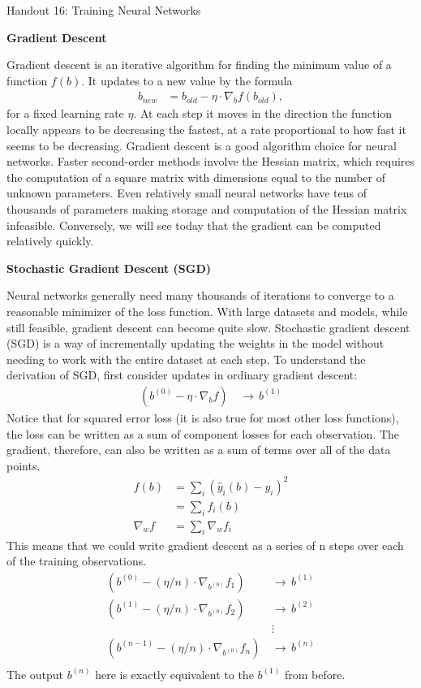 \documentclass[12pt,hidelinks]{article}
\numberwithin{equation}{section}
\begin{document}
{\LARGE Handout 16: Training Neural Networks}

\vspace*{18pt}

\textbf{Gradient Descent}

Gradient descent is an iterative
algorithm for finding the minimum value of a function $f(b)$. It updates
to a new value by the formula
\begin{align}
b_{new} &= b_{old} - \eta \cdot \nabla_{b} f (b_{old}),
\end{align}
for a fixed learning rate $\eta$. At each step it moves in the direction
the function locally appears to be decreasing the fastest, at a rate
proportional to how fast it seems to be decreasing. Gradient descent is
a good algorithm choice for neural networks. Faster second-order methods
involve the Hessian matrix, which requires the computation
of a square matrix with dimensions equal to the number of unknown parameters.
Even relatively small neural networks have tens of thousands of parameters
making storage and computation of the Hessian matrix infeasible. Conversely,
we will see today that the gradient can be computed
relatively quickly.

\textbf{Stochastic Gradient Descent (SGD)}

Neural networks generally need many thousands of iterations to converge to
a reasonable minimizer of the loss function. With large datasets
and models, while still feasible, gradient descent can become quite slow.
Stochastic gradient descent (SGD) is a way of incrementally updating
the weights in the model without needing to work with the entire
dataset at each step. To understand the derivation of SGD, first
consider updates in ordinary gradient descent:
\begin{align}
\left( b^{(0)} - \eta \cdot \nabla_b f \right) \, &\rightarrow \, b^{(1)}
\end{align}
Notice that for squared error loss (it is also true for most other
loss functions), the loss can be written as a sum of component losses
for each observation. The gradient, therefore, can also be written
as a sum of terms over all of the data points.
\begin{align}
f(b) &= \sum_i (\widehat{y}_i(b) - y_i)^2 \\
&= \sum_i f_i(b) \\
\nabla_w f &= \sum_i \nabla_w f_i
\end{align}
This means that we could write gradient descent as a series of
n steps over each of the training observations.
\begin{align}
\left( b^{(0)} - (\eta / n) \cdot \nabla_{b^{(0)}} f_1 \right) \, &\rightarrow \, b^{(1)} \\
\left( b^{(1)} - (\eta / n) \cdot \nabla_{b^{(0)}} f_2 \right) \, &\rightarrow \, b^{(2)} \\
&\vdots \\
\left( b^{(n-1)} - (\eta / n) \cdot \nabla_{b^{(0)}} f_n \right) \, &\rightarrow \, b^{(n)} \\
\end{align}
The output $b^{(n)}$ here is exactly equivalent to the $b^{(1)}$ from before.
\end{document}
